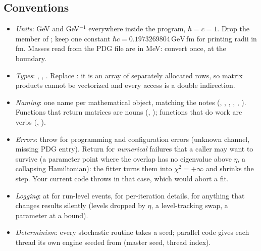 \documentclass[11pt,a4paper]{article}
\numberwithin{equation}{section}
\theoremstyle{definition}
\theoremstyle{plain}
\theoremstyle{remark}
\numberwithin{algorithm}{section}
\newcommand{\GeV}{\,\mathrm{GeV}}
\newcommand{\fm}{\,\mathrm{fm}}
\begin{document}
\subsection{Conventions}\label{sec:bp-conv}
\begin{itemize}[leftmargin=1.3em,itemsep=2pt]
\item \emph{Units}: GeV and GeV$^{-1}$ everywhere inside the program, $\hbar=c=1$. Drop the  member of ; keep one constant $\hbar c=0.1973269804\GeV\fm$ for printing radii in fm. Masses read from the PDG file are in MeV: convert once, at the boundary.
\item \emph{Types}: , , . Replace : it is an array of separately allocated rows, so matrix products cannot be vectorized and every access is a double indirection.
\item \emph{Naming}: one name per mathematical object, matching the notes (, , , , , ). Functions that return matrices are nouns (, ); functions that do work are verbs (, ).
\item \emph{Errors}: throw for programming and configuration errors (unknown channel, missing PDG entry). Return  for \emph{numerical} failures that a caller may want to survive (a parameter point where the overlap has no eigenvalue above $\eta$, a collapsing Hamiltonian): the fitter turns them into $\chi^2=+\infty$ and shrinks the step. Your current code throws in that case, which would abort a fit.
\item \emph{Logging}:  at  for run-level events,  for per-iteration details,  for anything that changes results silently (levels dropped by $\eta$, a level-tracking swap, a parameter at a bound).
\item \emph{Determinism}: every stochastic routine takes a seed; parallel code gives each thread its own engine seeded from (master seed, thread index).
\end{itemize}

\end{document}
